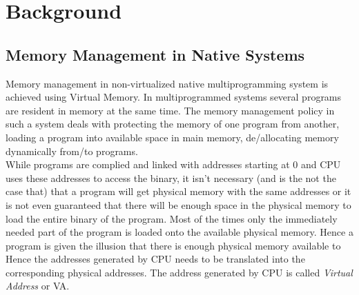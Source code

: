 \chapter{Background}

\section{Memory Management in Native Systems}
Memory management in non-virtualized native multiprogramming system is achieved using Virtual
Memory. In multiprogrammed systems several programs are resident in memory at the same time.
The memory management policy in such a system deals with protecting the memory of one program from 
another, loading a program into available space in main memory, de/allocating memory dynamically
from/to programs.\\
While programs are complied and linked with addresses starting at $0$ and CPU uses 
these addresses to access the binary, it isn't necessary (and is the not the case that) that a
program will get physical memory with the same addresses or it is not even guaranteed that there
will be enough space in the physical memory to load the entire binary of the program. Most of the
times only the immediately needed part of the program is loaded onto the available physical memory.
Hence a program is given the illusion that there is enough physical memory available to 
Hence the addresses generated by CPU needs to be translated into the corresponding physical
addresses. The address generated by CPU is called \textit{Virtual Address} or VA.

